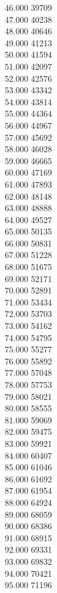 { 46.000	39709 \\
 47.000	40238 \\
 48.000	40646 \\
 49.000	41213 \\
 50.000	41594 \\
 51.000	42097 \\
 52.000	42576 \\
 53.000	43342 \\
 54.000	43814 \\
 55.000	44364 \\
 56.000	44967 \\
 57.000	45692 \\
 58.000	46028 \\
 59.000	46665 \\
 60.000	47169 \\
 61.000	47893 \\
 62.000	48148 \\
 63.000	48888 \\
 64.000	49527 \\
 65.000	50135 \\
 66.000	50831 \\
 67.000	51228 \\
 68.000	51675 \\
 69.000	52171 \\
 70.000	52891 \\
 71.000	53434 \\
 72.000	53703 \\
 73.000	54162 \\
 74.000	54795 \\
 75.000	55277 \\
 76.000	55892 \\
 77.000	57048 \\
 78.000	57753 \\
 79.000	58021 \\
 80.000	58555 \\
 81.000	59069 \\
 82.000	59475 \\
 83.000	59921 \\
 84.000	60407 \\
 85.000	61046 \\
 86.000	61692 \\
 87.000	61954 \\
 88.000	64924 \\
 89.000	68059 \\
 90.000	68386 \\
 91.000	68915 \\
 92.000	69331 \\
 93.000	69832 \\
 94.000	70421 \\
 95.000	71196 \\
}
